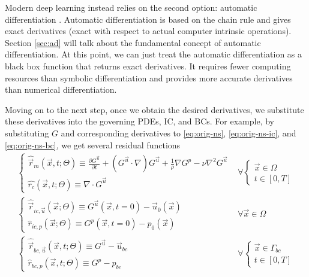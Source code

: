 Modern deep learning instead relies on the second option: automatic differentiation \cite{griewank_automatic_1988}.
Automatic differentiation is based on the chain rule and gives exact derivatives (exact with respect to actual computer intrinsic operations).
Section \ref{sec:ad} will talk about the fundamental concept of automatic differentiation.
At this point, we can just treat the automatic differentiation as a black box function that returns exact derivatives.
It requires fewer computing resources than symbolic differentiation and provides more accurate derivatives than numerical differentiation.

Moving on to the next step, once we obtain the desired derivatives, we substitute these derivatives into the governing PDEs, IC, and BCs.
For example, by substituting $G$ and corresponding derivatives to \eqref{eq:orig-ns}, \eqref{eq:orig-ns-ic}, and \eqref{eq:orig-ns-bc}, we get several residual functions
\begin{equation}\label{eq:residuals}
    \begin{array}{ll}
        \left\{
            \begin{array}{l}
            \hat{\vec{r}}_{m}(\vec{x}, t; \Theta) \equiv \frac{\partial G^{\vec{u}}}{\partial t}+(G^{\vec{u}} \cdot \nabla) G^{\vec{u}}+\frac{1}{\rho} \nabla G^p -\nu \nabla^{2} G^{\vec{u}} \\
            \hat{r_{c}}(\vec{x}, t; \Theta) \equiv \nabla \cdot G^{\vec{u}} 
            \end{array}
        \right. &
        \forall
        \left\{
            \begin{array}{l}
                \vec{x} \in \Omega \\ t \in [0, T]
            \end{array}
        \right. \\
        \left\{
            \begin{array}{l}
            \hat{\vec{r}}_{ic,\vec{u}}(\vec{x}; \Theta) \equiv G^{\vec{u}}(\vec{x}, t=0)-\vec{u}_0(\vec{x}) \\
            \hat{r}_{ic,p}(\vec{x}; \Theta) \equiv G^{p}(\vec{x}, t=0)-p_0(\vec{x})
            \end{array}
        \right. &
        \forall
        \vec{x} \in \Omega \\
        \left\{
            \begin{array}{l}
            \hat{\vec{r}}_{bc,\vec{u}}(\vec{x}, t; \Theta) \equiv G^{\vec{u}}-\vec{u}_{bc} \\
            \hat{r}_{bc,p}(\vec{x}, t; \Theta) \equiv G^{p}-p_{bc}
            \end{array}
        \right. &
        \forall
        \left\{
            \begin{array}{l}
                \vec{x} \in \Gamma_{bc} \\ t \in [0, T]
            \end{array}
        \right.
    \end{array}
\end{equation}
